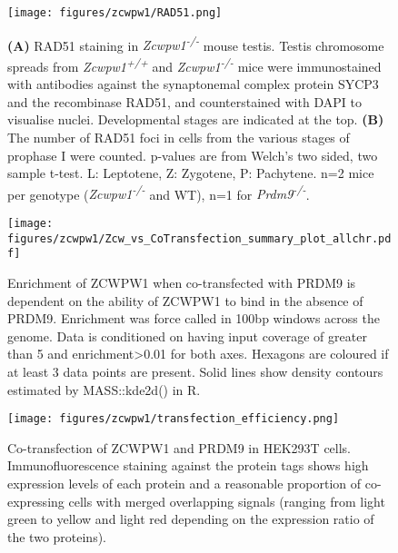 \begin{figure}[H]
	\centering
	\texttt{[image: figures/zcwpw1/RAD51.png]}
	\caption[RAD51 Counts]{
		\textbf{(A)} RAD51 staining in \textit{Zcwpw1\textsuperscript{-/-}} mouse testis.
			Testis chromosome spreads from \textit{Zcwpw1\textsuperscript{+/+}} and \textit{Zcwpw1\textsuperscript{-/-}} mice were immunostained with antibodies against the synaptonemal complex protein SYCP3 and the recombinase RAD51, and counterstained with DAPI to visualise nuclei.
			Developmental stages are indicated at the top.
		\textbf{(B)} The number of RAD51 foci in cells from the various stages of prophase I were counted.
			p-values are from Welch’s two sided, two sample t-test.
			L: Leptotene, Z: Zygotene, P: Pachytene.
			n=2 mice per genotype (\textit{Zcwpw1\textsuperscript{-/-}} and WT), n=1 for \textit{Prdm9\textsuperscript{-/-}}.
	}
	\label{fig:Rad51}
\end{figure}


\begin{figure}[H]
	\centering
	\texttt{[image: figures/zcwpw1/Zcw\_vs\_CoTransfection\_summary\_plot\_allchr.pdf]}
	\caption[Zcwpw1 alone vs Co-transfection]{
		Enrichment of ZCWPW1 when co-transfected with PRDM9 is dependent on the ability of ZCWPW1 to bind in the absence of PRDM9.
		Enrichment was force called in 100bp windows across the genome.
		Data is conditioned on having input coverage of greater than 5 and enrichment>0.01 for both axes.
		Hexagons are coloured if at least 3 data points are present.
		Solid lines show density contours estimated by MASS::kde2d() in R.
	}
	\label{fig:Zcw_vs_cotransfection}
\end{figure}


\begin{figure}[H]
	\centering
	\texttt{[image: figures/zcwpw1/transfection\_efficiency.png]}
	\caption[Transfection Efficiency]{
		Co-transfection of ZCWPW1 and PRDM9 in HEK293T cells.
		Immunofluorescence staining against the protein tags shows high expression levels of each protein and a reasonable proportion of co-expressing cells with merged overlapping signals (ranging from light green to yellow and light red depending on the expression ratio of the two proteins).
	}
	\label{fig:transfection_efficiency}
\end{figure}


